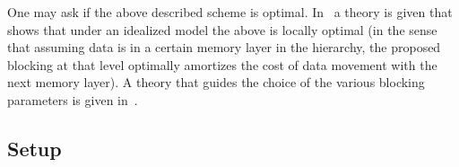 One may ask if the above described scheme is optimal.  In~\cite{ITXGEMM:ICCS01} a theory is given that shows that under an idealized model the above is locally optimal (in the sense that assuming data is in a certain memory layer in the hierarchy, the proposed blocking at that level optimally amortizes the cost of data movement with the next memory layer).  A theory that guides the choice of the various blocking parameters is given in~\cite{BLIS4}.

\subsection{Setup}

\begin{figure}[tb!]
	\begin{center}
\begin{minipage}{4in}
	\dirtree{%
		.1 step3.
		.2 README 
.
		.2 sourceme.sh 
.
		.2 makefile 
.
		.2 dgemm 
.
		.3 my\_dgemm.c 
.
		.3 bl\_dgemm\_ref.c 
.
		.3 bl\_dgemm\_util.c 
.
		.2 include 
.
		.3 avx\_types.h 
.
		.3 bl\_dgemm.h 
.
		.3 bl\_dgemm\_ref.h 
.
		.3 bl\_config.h 
.
		.3 bl\_dgemm\_kernel.h 
.
		.2 kernels
.
		.3 bl\_dgemm\_ukr.c
.
		.3 bl\_dgemm\_int\_8x4.c
.
		.3 bl\_dgemm\_asm\_8x4.c
.
		.3 bl\_dgemm\_asm\_8x6.c
.
		.3 bl\_dgemm\_asm\_12x4.c
.
		.2 lib 
}
\end{minipage}
\end{center}
\end{figure}
